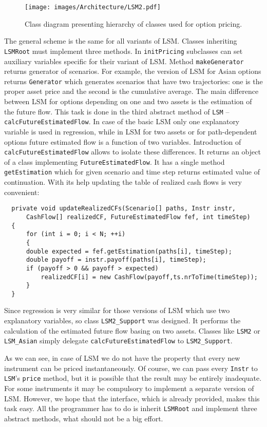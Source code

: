 \documentclass[a4paper,11pt, twoside]{book}
\theoremstyle{definition}
\theoremstyle{remark}
\newcounter{example}[chapter]
\begin{document}
\begin{figure}
\centering
 \texttt{[image: images/Architecture/LSM2.pdf]}
\caption{Class diagram presenting hierarchy of classes used for option pricing.}
\label{fig:arch:LSM}
\end{figure}
\newpage

The general scheme is the same for all variants of LSM. Classes inheriting \texttt{LSMRoot} must implement three methods. In \texttt{initPricing} subclasses can set auxiliary variables specific for their variant of LSM. Method \texttt{makeGenerator} returns generator of scenarios. For example, the version of LSM for Asian options returns \texttt{Generator} which generates scenarios that have two trajectories: one is the proper asset price and the second is the cumulative average. The main difference between LSM for options depending on one and two assets is the estimation of the future flow. This task is done in the third abstract method of \texttt{LSM} -- \texttt{calcFutureEstimatedFlow}. In case of the basic LSM only one explanatory variable is used in regression, while in LSM for two assets or for path-dependent options future estimated flow is a function of two variables. Introduction of \texttt{calcFutureEstimatedFlow} allows to isolate these differences. It returns an object of a class implementing \texttt{FutureEstimatedFlow}. It has a single method \texttt{getEstimation} which for given scenario and time step returns estimated value of continuation. With its help updating the table of realized cash flows is very convenient:
\begin{lstlisting}
  private void updateRealizedCFs(Scenario[] paths, Instr instr,
      CashFlow[] realizedCF, FutureEstimatedFlow fef, int timeStep)
  {
      for (int i = 0; i < N; ++i)
      {
	  double expected = fef.getEstimation(paths[i], timeStep);
	  double payoff = instr.payoff(paths[i], timeStep);
	  if (payoff > 0 && payoff > expected)
	      realizedCF[i] = new CashFlow(payoff,ts.nrToTime(timeStep));
      }
  }
\end{lstlisting}

Since regression is very similar for those versions of LSM which use two explanatory variables, so class \texttt{LSM2\_Support} was designed. It performs the calculation of the estimated future flow basing on two assets. Classes like \texttt{LSM2} or \texttt{LSM\_Asian} simply delegate \texttt{calcFutureEstimatedFlow} to \texttt{LSM2\_Support}.
   
As we can see, in case of LSM we do not have the property that every new instrument can be priced instantaneously. Of course, we can pass every \texttt{Instr} to \texttt{LSM}'s \texttt{price} method, but it is possible that the result may be entirely inadequate. For some instruments it may be compulsory to implement a separate version of LSM. However, we hope that the interface, which is already provided, makes this task easy. All the programmer has to do is inherit \texttt{LSMRoot} and implement three abstract methods, what should not be a big effort.
\end{document}
